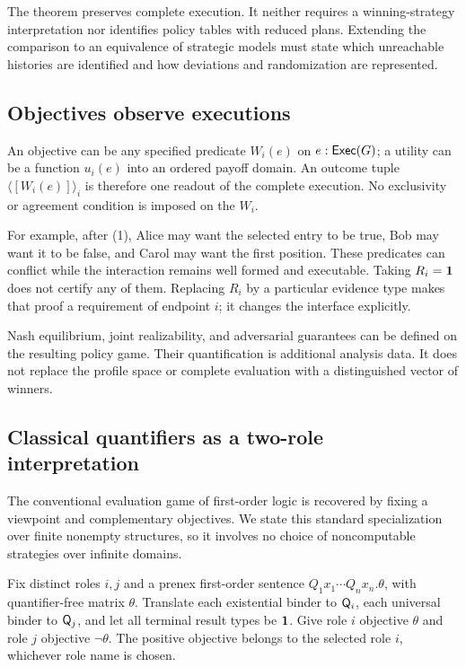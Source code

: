 The theorem preserves complete execution. It neither requires a
winning-strategy interpretation nor identifies policy tables with reduced
plans. Extending the comparison to an equivalence of strategic models must
state which unreachable histories are identified and how deviations and
randomization are represented.

\subsection{Objectives observe executions}

An objective can be any specified predicate $W_i(e)$ on $e:\mathsf{Exec}(G)$; a utility
can be a function $u_i(e)$ into an ordered payoff domain. An outcome tuple
$\langle[W_i(e)]\rangle_i$ is therefore one readout of the complete execution.
No exclusivity or agreement condition is imposed on the $W_i$.

For example, after (1), Alice may want the selected entry to be true, Bob may
want it to be false, and Carol may want the first position. These predicates
can conflict while the interaction remains well formed and executable.
Taking $R_i=\mathbf 1$ does not certify any of them. Replacing $R_i$ by a
particular evidence type makes that proof a requirement of endpoint $i$;
it changes the interface explicitly.

Nash equilibrium, joint realizability, and adversarial guarantees can be
defined on the resulting policy game. Their quantification is additional
analysis data. It does not replace the profile space or complete evaluation
with a distinguished vector of winners.

\subsection{Classical quantifiers as a two-role interpretation}

The conventional evaluation game of first-order logic is recovered by fixing
a viewpoint and complementary objectives. We state this standard
specialization over finite nonempty structures, so it involves no choice of
noncomputable strategies over infinite domains.

Fix distinct roles $i,j$ and a prenex first-order sentence
$Q_1x_1\cdots Q_nx_n.\theta$, with quantifier-free matrix $\theta$.
Translate each existential binder to $\mathsf Q_i$, each universal binder to
$\mathsf Q_j$, and let all terminal result types be $\mathbf 1$. Give role $i$ objective
$\theta$ and role $j$ objective $\neg\theta$. The positive objective belongs
to the selected role $i$, whichever role name is chosen.

